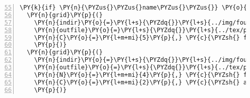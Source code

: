 \begin{Verbatim}[commandchars=\\\{\},numbers=left,numbersep=0.5em,firstnumber=55]
\PY{k}{if} \PY{n}{\PYZus{}\PYZus{}name\PYZus{}\PYZus{}} \PY{o}{==} \PY{l+s}{\PYZdq{}}\PY{l+s}{\PYZus{}\PYZus{}main\PYZus{}\PYZus{}}\PY{l+s}{\PYZdq{}}\PY{p}{:}
  \PY{n}{grid}\PY{p}{(}
    \PY{n}{indir}\PY{o}{=}\PY{l+s}{\PYZdq{}}\PY{l+s}{../img/fouriers}\PY{l+s}{\PYZdq{}}\PY{p}{,} 
    \PY{n}{outfile}\PY{o}{=}\PY{l+s}{\PYZdq{}}\PY{l+s}{../tex/pieces/grid.tex}\PY{l+s}{\PYZdq{}}\PY{p}{,}
    \PY{n}{C}\PY{o}{=}\PY{l+m+mi}{5}\PY{p}{,} \PY{c}{\PYZsh{} five columns, all images}
    \PY{p}{)}
  \PY{n}{grid}\PY{p}{(}
    \PY{n}{indir}\PY{o}{=}\PY{l+s}{\PYZdq{}}\PY{l+s}{../img/fouriers}\PY{l+s}{\PYZdq{}}\PY{p}{,}
    \PY{n}{outfile}\PY{o}{=}\PY{l+s}{\PYZdq{}}\PY{l+s}{../tex/pieces/closeup.tex}\PY{l+s}{\PYZdq{}}\PY{p}{,}
    \PY{n}{N}\PY{o}{=}\PY{l+m+mi}{4}\PY{p}{,} \PY{c}{\PYZsh{} four images total}
    \PY{n}{C}\PY{o}{=}\PY{l+m+mi}{2}\PY{p}{,} \PY{c}{\PYZsh{} across two columns}
    \PY{p}{)}
\end{Verbatim}
